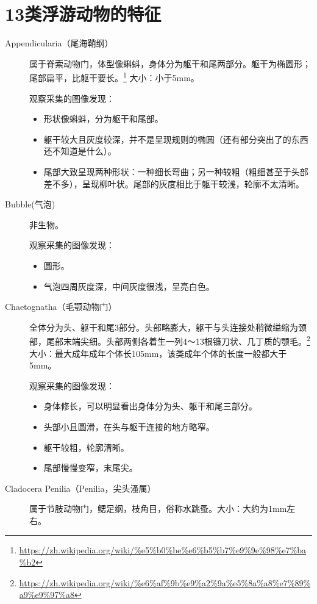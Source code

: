 \section{13类浮游动物的特征}
\begin{description}
    \item[Appendicularia（尾海鞘纲）] 属于脊索动物门，体型像蝌蚪，身体分为躯干和尾两部分。躯干为椭圆形；尾部扁平，比躯干要长。\footnote{\url{https://zh.wikipedia.org/wiki/\%e5\%b0\%be\%e6\%b5\%b7\%e9\%9e\%98\%e7\%ba\%b2}} 大小：小于5mm。
    
    观察采集的图像发现：
    \begin{itemize}
        \item 形状像蝌蚪，分为躯干和尾部。
        \item 躯干较大且灰度较深，并不是呈现规则的椭圆（还有部分突出了的东西还不知道是什么）。
        \item 尾部大致呈现两种形状：一种细长弯曲；另一种较粗（粗细甚至于头部差不多），呈现柳叶状。尾部的灰度相比于躯干较浅，轮廓不太清晰。
    \end{itemize}
    \item[Bubble(气泡)] 非生物。
    
    观察采集的图像发现：
        \begin{itemize}
        \item 圆形。
        \item 气泡四周灰度深，中间灰度很浅，呈亮白色。
        \end{itemize}
    \item[Chaetognatha（毛颚动物门）] 全体分为头、躯干和尾3部分。头部略膨大，躯干与头连接处稍微缢缩为颈部，尾部末端尖细。头部两侧各着生一列4～13根镰刀状、几丁质的颚毛。\footnote{\url{https://zh.wikipedia.org/wiki/\%e6\%af\%9b\%e9\%a2\%9a\%e5\%8a\%a8\%e7\%89\%a9\%e9\%97\%a8}}大小：最大成年成年个体长105mm，该类成年个体的长度一般都大于5mm。
    
    观察采集的图像发现：
        \begin{itemize}
        \item 身体修长，可以明显看出身体分为头、躯干和尾三部分。
        \item 头部小且圆滑，在头与躯干连接的地方略窄。
        \item 躯干较粗，轮廓清晰。
        \item 尾部慢慢变窄，末尾尖。
        \end{itemize}
    \item[Cladocera Penilia（Penilia，尖头溞属）] 属于节肢动物门，鳃足纲，枝角目，俗称水跳蚤。大小：大约为1mm左右。
    

\end{description}
